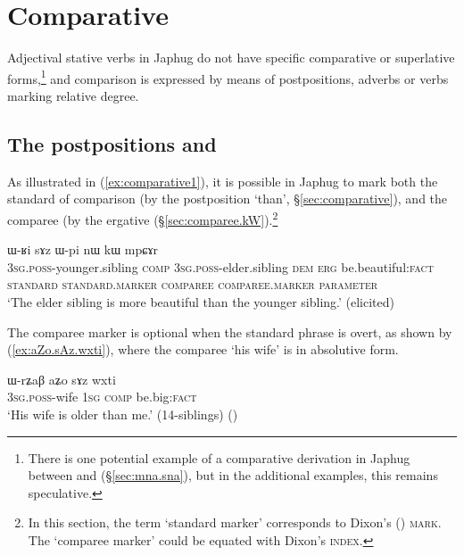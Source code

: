 \section{Comparative} \label{sec:comparison}

Adjectival stative verbs in Japhug do not have specific comparative or superlative forms,\footnote{There is  one potential example of a comparative derivation in Japhug between  and  (§\ref{sec:mna.sna}), but in the additional examples, this remains speculative. } and comparison is expressed by means of postpositions, adverbs or verbs marking relative degree.


\subsection{The postpositions  and } \label{sec:sAz.kW}
As illustrated in (\ref{ex:comparative1}), it is possible in Japhug to mark both the  standard of comparison (by the postposition  `than', §\ref{sec:comparative}), and the comparee (by  the ergative  (§\ref{sec:comparee.kW}).\footnote{In this section, the term `standard marker' corresponds to Dixon's (\citeyear{dixon08comparative}) \textsc{mark}. The `comparee marker' could be equated with Dixon's \textsc{index}. } 


\begin{exe}
\ex \label{ex:comparative1}
\glll  ɯ-ʁi sɤz ɯ-pi nɯ {                  } kɯ   mpɕɤr  \\
\textsc{3sg}.\textsc{poss}-younger.sibling \textsc{comp} \textsc{3sg}.\textsc{poss}-elder.sibling \textsc{dem} {   } \textsc{erg} be.beautiful:\textsc{fact} \\
\textsc{standard} \textsc{standard}.\textsc{marker} \textsc{comparee} { } {         } \textsc{comparee}.\textsc{marker} \textsc{parameter} \\
\glt `The elder sibling is more beautiful than the younger sibling.'  (elicited)
\end{exe}


The comparee marker is optional when the standard phrase is overt, as shown by (\ref{ex:aZo.sAz.wxti}), where the comparee  `his wife' is in absolutive form.

\begin{exe}
\ex \label{ex:aZo.sAz.wxti}
\gll ɯ-rʑaβ aʑo sɤz wxti \\
\textsc{3sg}.\textsc{poss}-wife \textsc{1sg} \textsc{comp} be.big:\textsc{fact} \\
\glt `His wife is older than me.' (14-siblings)
()
\end{exe}

